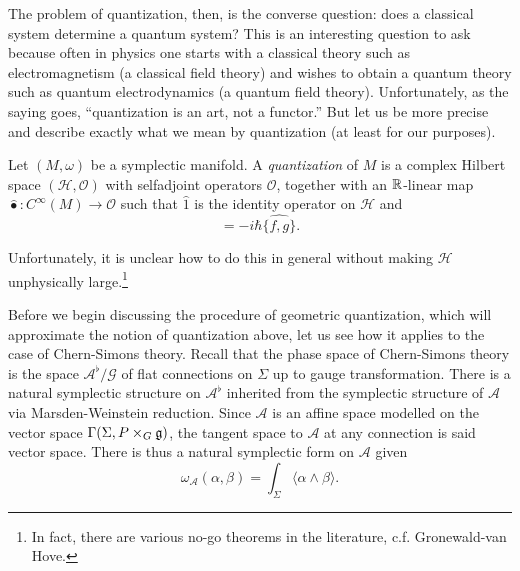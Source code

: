 \documentclass{amsart}
\begin{document}
The problem of quantization, then, is the converse question: does a classical system determine
a quantum system? This is an interesting question to ask because often in physics one starts
with a classical theory such as electromagnetism (a classical field theory) and wishes to obtain
a quantum theory such as quantum electrodynamics (a quantum field theory). Unfortunately, as the saying
goes, ``quantization is an art, not a functor.'' But let us be more precise and describe exactly
what we mean by quantization (at least for our purposes).
\begin{definition}[Dirac]
    Let $(M,\omega)$ be a symplectic manifold. A \textit{quantization} of $M$ is a complex Hilbert space
    $(\mathcal{H},\mathcal{O})$ with selfadjoint operators $\mathcal{O}$, together with an $\mathbb{R}$-linear map
    $\hat\bullet:C^\infty(M)\to\mathcal{O}$ such that $\hat1$ is the identity operator on $\mathcal{H}$ and 
    \begin{equation*}
        [\hat f,\hat g] = -i\hbar\widehat{\{f,g\}}.
    \end{equation*}
\end{definition}

Unfortunately, it is unclear how to do this in general without making $\mathcal{H}$ unphysically
large.\footnote{In fact, there are various no-go theorems in the literature, c.f. Gronewald-van Hove.}

Before we begin discussing the procedure of geometric quantization, which will approximate the
notion of quantization above, let us see how it applies to the case of Chern-Simons theory.
Recall that the phase space of Chern-Simons theory is the space $\mathscr{A}^\flat/\mathscr{G}$
of flat connections on $\Sigma$ up to gauge transformation. There is a natural symplectic structure on
$\mathscr{A}^\flat$ inherited from the symplectic structure of $\mathscr{A}$ via Marsden-Weinstein reduction.
Since $\mathscr{A}$ is an affine space modelled on the vector space $\Gamma(\Sigma,P\times_G\mathfrak g)$, the
tangent space to $\mathscr{A}$ at any connection is said vector space.
There is thus a natural symplectic form on $\mathscr{A}$ given
\begin{equation*}
    \omega_\mathscr{A}(\alpha,\beta) = \int_\Sigma \langle \alpha\wedge\beta\rangle.
\end{equation*}
\end{document}
